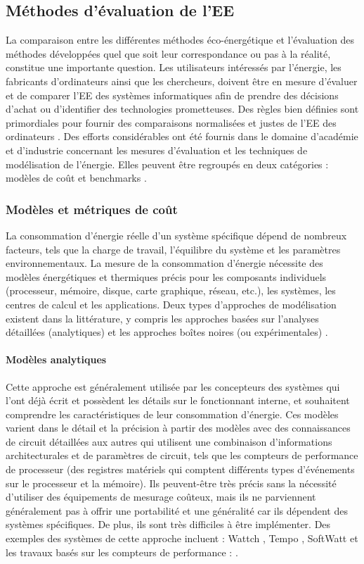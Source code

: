 \subsection{Méthodes d'évaluation de l'EE}
La comparaison entre les différentes méthodes éco-énergétique et l'évaluation des méthodes développées quel que soit leur correspondance ou pas à la réalité, constitue une importante question.
Les utilisateurs intéressés par l'énergie, les fabricants d'ordinateurs ainsi que les chercheurs, doivent être en mesure d'évaluer et de comparer l'EE des systèmes informatiques afin de prendre des décisions d'achat ou d'identifier des technologies prometteuses. Des règles bien définies sont primordiales pour fournir des comparaisons normalisées et justes de l'EE des ordinateurs \cite{Rivoire07}.
Des efforts considérables ont été fournis dans le domaine d'académie et d'industrie concernant les mesures d'évaluation et les techniques de modélisation de l'énergie. Elles peuvent être regroupés en deux catégories : modèles de coût et benchmarks \cite{Wang11}.

\subsubsection{Modèles et métriques de coût}
La consommation d'énergie réelle d'un système spécifique dépend de nombreux facteurs, tels que la charge de travail, l'équilibre du système et les paramètres environnementaux. La mesure de la consommation d'énergie nécessite des modèles énergétiques et thermiques précis pour les composants individuels (processeur, mémoire, disque, carte graphique, réseau, etc.), les systèmes, les centres de calcul et les applications.
Deux types d'approches de modélisation existent dans la littérature, y compris les approches basées sur l'analyses détaillées (analytiques) et les approches boîtes noires (ou expérimentales) \cite{Rivoire08}.

\paragraph{Modèles analytiques}
Cette approche est généralement utilisée par les concepteurs des systèmes qui l'ont déjà écrit et possèdent les détails sur le fonctionnant interne, et souhaitent comprendre les caractéristiques de leur consommation d'énergie. Ces modèles varient dans le détail et la précision à partir des modèles avec des connaissances de circuit détaillées aux autres qui utilisent une combinaison d'informations architecturales et de paramètres de circuit, tels que les compteurs de performance de processeur (des registres matériels qui comptent différents types d'événements sur le processeur et la mémoire). Ils peuvent-être très précis sans la nécessité d'utiliser des équipements de mesurage coûteux, mais ils ne parviennent généralement pas à offrir une portabilité et une généralité car ils dépendent des systèmes spécifiques. De plus, ils sont très difficiles à être implémenter. Des exemples des systèmes de cette approche incluent : Wattch \cite{Brooks00}, Tempo \cite{Shafi03}, SoftWatt \cite{Gurumurthi02} et les travaux basés sur les compteurs de performance : \cite{Contreras05,Joseph01,Li03}.

